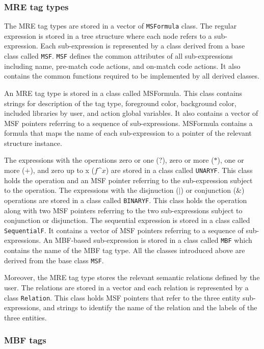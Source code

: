 \subsubsection{MRE tag types}

The MRE tag types are stored in a vector of {\tt MSFormula} class. 
The regular expression is stored in a tree structure where each node refers to a sub-expression. 
Each sub-expression is represented by a class derived from a base class called {\tt MSF}. 
{\tt MSF} defines the common attributes of all sub-expressions including name, pre-match code actions, and on-match code actions. 
It also contains the common functions required to be implemented by all derived classes.

An MRE tag type is stored in a class called MSFormula. 
This class contains strings for description of the tag type, foreground color, 
background color, included libraries by user, and action global variables. 
It also contains a vector of MSF pointers referring to a sequence of sub-expressions. 
MSFormula contains a formula that maps the name of each sub-expression to a pointer of the relevant structure instance.

The expressions with the operations zero or one ($?$), 
zero or more ($*$), one or more ($+$), and zero up to x ($f$\textasciicircum$x$) 
are stored in a class called {\tt UNARYF}. 
This class holds the operation and an MSF pointer referring to the sub-expression subject to the operation. 
The expressions with the disjnuction ($|$) or conjunction ($\&$) operations 
are stored in a class called {\tt BINARYF}. 
This class holds the operation along with two MSF pointers referring to the two sub-expressions subject to conjunction or disjunction. 
The sequential expression is stored in a class called {\tt SequentialF}. 
It contains a vector of MSF pointers referring to a sequence of sub-expressions. 
An MBF-based sub-expression is stored in a class called {\tt MBF} which contains the name of the MBF tag type. 
All the classes introduced above are derived from the base class {\tt MSF}.

Moreover, the MRE tag type stores the relevant semantic relations defined by the user. 
The relations are stored in a vector and each relation is represented by a class {\tt Relation}. 
This class holds MSF pointers that refer to the three entity sub-expressions, and strings to identify the name of the relation and the labels of the three entities.

\subsubsection{MBF tags}


